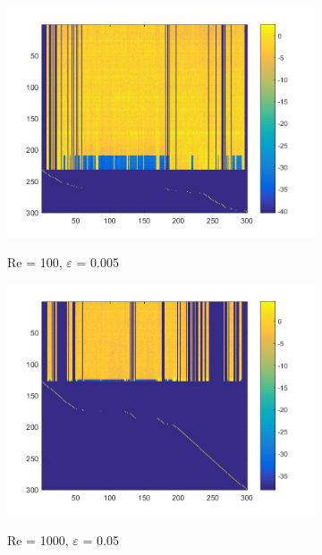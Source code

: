 \documentclass[letterpaper,12pt,peerreviewca,draftcls]{IEEEtran}
\begin{document}
\begin{figure}[h]
	\centering
	\captionsetup[subfigure]{aboveskip = -12pt}
	\begin{subfigure}[t]{0.5\textwidth}
		\includegraphics[width=\linewidth]{"Figure S9a"}
		\label{fig:eigen100}
		\caption{Re = 100, $\varepsilon$ = 0.005}
	\end{subfigure}
	\begin{subfigure}[t]{0.5\textwidth}
		\includegraphics[width=\linewidth]{"Figure S9b"}
		\label{fig:eigen1000}
		\caption{Re = 1000, $\varepsilon$ = 0.05}
	\end{subfigure}
	\begin{subfigure}[t]{0.5\textwidth}

\end{subfigure}
\end{figure}
\end{document}
